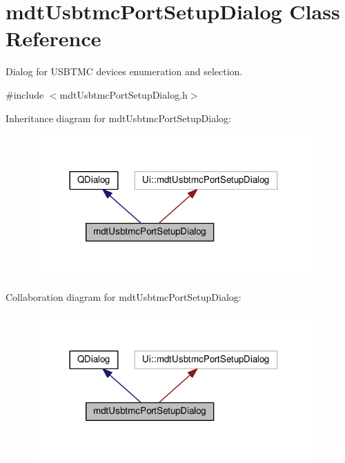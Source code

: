 \hypertarget{classmdt_usbtmc_port_setup_dialog}{\section{mdt\-Usbtmc\-Port\-Setup\-Dialog Class Reference}
\label{classmdt_usbtmc_port_setup_dialog}
}


Dialog for U\-S\-B\-T\-M\-C devices enumeration and selection.  




{\ttfamily \#include $<$mdt\-Usbtmc\-Port\-Setup\-Dialog.\-h$>$}



Inheritance diagram for mdt\-Usbtmc\-Port\-Setup\-Dialog\-:\nopagebreak
\begin{figure}[H]
\begin{center}
\leavevmode
\includegraphics[width=305pt]{classmdt_usbtmc_port_setup_dialog__inherit__graph}
\end{center}
\end{figure}


Collaboration diagram for mdt\-Usbtmc\-Port\-Setup\-Dialog\-:\nopagebreak
\begin{figure}[H]
\begin{center}
\leavevmode
\includegraphics[width=305pt]{classmdt_usbtmc_port_setup_dialog__coll__graph}
\end{center}
\end{figure}

